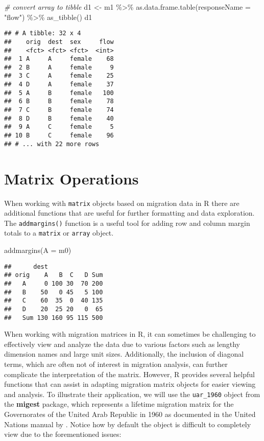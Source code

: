 \documentclass[
]{book}
\newenvironment{Shaded}{\begin{snugshade}}{\end{snugshade}}
\newcommand{\AttributeTok}[1]{\textcolor[rgb]{0.77,0.63,0.00}{#1}}
\newcommand{\CommentTok}[1]{\textcolor[rgb]{0.56,0.35,0.01}{\textit{#1}}}
\newcommand{\FunctionTok}[1]{\textcolor[rgb]{0.00,0.00,0.00}{#1}}
\newcommand{\NormalTok}[1]{#1}
\newcommand{\OtherTok}[1]{\textcolor[rgb]{0.56,0.35,0.01}{#1}}
\newcommand{\SpecialCharTok}[1]{\textcolor[rgb]{0.00,0.00,0.00}{#1}}
\newcommand{\StringTok}[1]{\textcolor[rgb]{0.31,0.60,0.02}{#1}}
\begin{document}
\begin{Shaded}
\begin{Highlighting}[]
\CommentTok{\# convert array to tibble}
\NormalTok{d1 }\OtherTok{\textless{}{-}}\NormalTok{ m1 }\SpecialCharTok{\%\textgreater{}\%}
  \FunctionTok{as.data.frame.table}\NormalTok{(}\AttributeTok{responseName =} \StringTok{"flow"}\NormalTok{) }\SpecialCharTok{\%\textgreater{}\%}
  \FunctionTok{as\_tibble}\NormalTok{()}
\NormalTok{d1}
\end{Highlighting}
\end{Shaded}

\begin{verbatim}
## # A tibble: 32 x 4
##    orig  dest  sex     flow
##    <fct> <fct> <fct>  <int>
##  1 A     A     female    68
##  2 B     A     female     9
##  3 C     A     female    25
##  4 D     A     female    37
##  5 A     B     female   100
##  6 B     B     female    78
##  7 C     B     female    74
##  8 D     B     female    40
##  9 A     C     female     5
## 10 B     C     female    96
## # ... with 22 more rows
\end{verbatim}

\hypertarget{matrix-operations}{%
\section{Matrix Operations}\label{matrix-operations}}

When working with \texttt{matrix} objects based on migration data in R there are additional functions that are useful for further formatting and data exploration. The \texttt{addmargins()} function is a useful tool for adding row and column margin totals to a \texttt{matrix} or \texttt{array} object.

\begin{Shaded}
\begin{Highlighting}[]
\FunctionTok{addmargins}\NormalTok{(}\AttributeTok{A =}\NormalTok{ m0)}
\end{Highlighting}
\end{Shaded}

\begin{verbatim}
##      dest
## orig    A   B  C   D Sum
##   A     0 100 30  70 200
##   B    50   0 45   5 100
##   C    60  35  0  40 135
##   D    20  25 20   0  65
##   Sum 130 160 95 115 500
\end{verbatim}

When working with migration matrices in R, it can sometimes be challenging to effectively view and analyze the data due to various factors such as lengthy dimension names and large unit sizes. Additionally, the inclusion of diagonal terms, which are often not of interest in migration analysis, can further complicate the interpretation of the matrix. However, R provides several helpful functions that can assist in adapting migration matrix objects for easier viewing and analysis. To illustrate their application, we will use the \texttt{uar\_1960} object from the \textbf{migest} package, which represents a lifetime migration matrix for the Governorates of the United Arab Republic in 1960 as documented in the United Nations manual by \citet{UnitedNations1983}. Notice how by default the object is difficult to completely view due to the forementioned issues:
\end{document}
